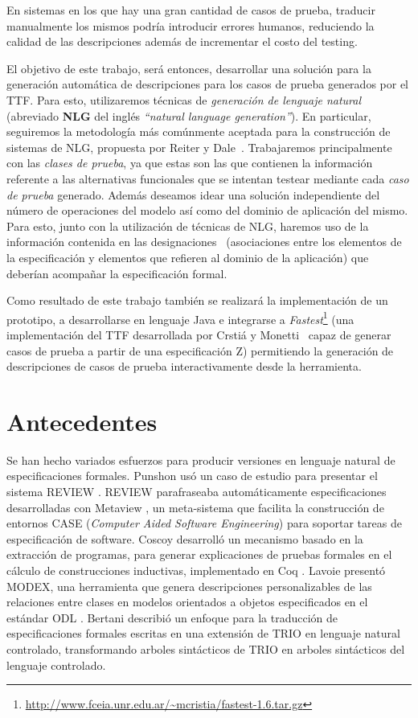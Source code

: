 En sistemas en los que hay una gran cantidad de casos de prueba, traducir manualmente los mismos podría introducir errores humanos, reduciendo la calidad de las descripciones además de incrementar el costo del testing.

El objetivo de este trabajo, será entonces, desarrollar una solución para la generación automática de descripciones para los casos de prueba generados por el TTF. Para esto, utilizaremos técnicas de \emph{generación de lenguaje natural} (abreviado \textbf{NLG} del inglés  \emph{``natural language generation''}). En particular, seguiremos la metodología más comúnmente aceptada para la construcción de sistemas de NLG, propuesta por Reiter y Dale~\cite{reiter_dale}. Trabajaremos principalmente con las \emph{clases de prueba}, ya que estas son las que contienen la información referente a las alternativas funcionales que se intentan testear mediante cada \emph{caso de prueba} generado. Además deseamos idear una solución independiente del número de operaciones del modelo así como del dominio de aplicación del mismo. Para esto, junto con la utilización de técnicas de NLG, haremos uso de la información contenida en las designaciones~\cite{jackson} (asociaciones entre los elementos de la especificación y elementos que refieren al dominio de la aplicación) que deberían acompañar la especificación formal. 


Como resultado de este trabajo también se realizará la implementación de un prototipo, a desarrollarse en lenguaje Java e integrarse a \emph{Fastest}\footnote{\url{http://www.fceia.unr.edu.ar/~mcristia/fastest-1.6.tar.gz}} (una implementación del TTF desarrollada por Crstiá y Monetti~\cite{fastest1} capaz de generar casos de prueba a partir de una especificación Z) permitiendo la generación de descripciones de casos de prueba interactivamente desde la herramienta. 

\section{Antecedentes}

Se han hecho variados esfuerzos para producir versiones en lenguaje natural de especificaciones formales. Punshon \cite{punshon} usó un caso de estudio para presentar el sistema REVIEW \cite{review}. REVIEW parafraseaba automáticamente especificaciones desarrolladas con Metaview \cite{metaview}, un meta-sistema que facilita la construcción de entornos CASE (\textit{Computer Aided Software Engineering}) para soportar tareas de especificación de software. Coscoy \cite{coscoy} desarrolló un mecanismo basado en la extracción de programas, para generar explicaciones de pruebas formales en el cálculo de construcciones inductivas, implementado en Coq \cite{coq}. Lavoie \cite{lavoie} presentó MODEX, una herramienta que genera descripciones personalizables de las relaciones entre clases en modelos orientados a objetos especificados en el estándar ODL \cite{odl}. Bertani \cite{bertani} describió un enfoque para la traducción de especificaciones formales escritas en una extensión de TRIO \cite{trio} en lenguaje natural controlado, transformando arboles sintácticos de TRIO en arboles sintácticos del lenguaje controlado.  

